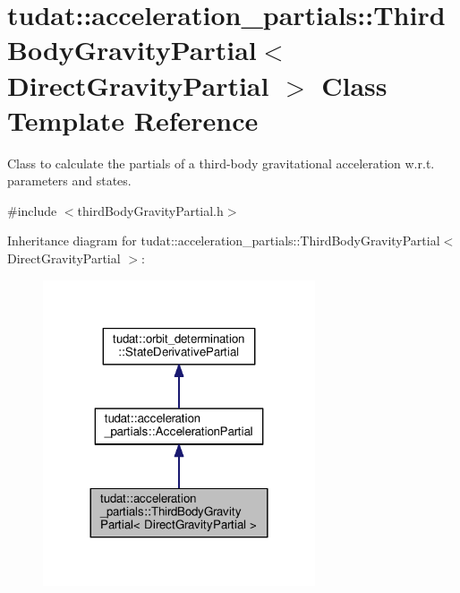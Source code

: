 \hypertarget{classtudat_1_1acceleration__partials_1_1ThirdBodyGravityPartial}{}\section{tudat\+:\+:acceleration\+\_\+partials\+:\+:Third\+Body\+Gravity\+Partial$<$ Direct\+Gravity\+Partial $>$ Class Template Reference}
\label{classtudat_1_1acceleration__partials_1_1ThirdBodyGravityPartial}


Class to calculate the partials of a third-\/body gravitational acceleration w.\+r.\+t. parameters and states.  




{\ttfamily \#include $<$third\+Body\+Gravity\+Partial.\+h$>$}



Inheritance diagram for tudat\+:\+:acceleration\+\_\+partials\+:\+:Third\+Body\+Gravity\+Partial$<$ Direct\+Gravity\+Partial $>$\+:
\nopagebreak
\begin{figure}[H]
\begin{center}
\leavevmode
\includegraphics[width=228pt]{classtudat_1_1acceleration__partials_1_1ThirdBodyGravityPartial__inherit__graph}
\end{center}
\end{figure}


